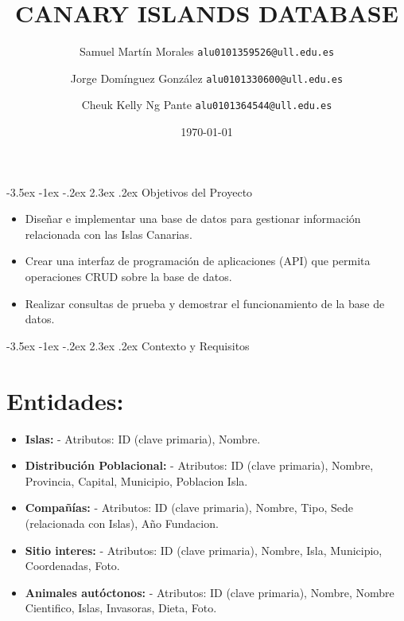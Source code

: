 \documentclass[11pt]{report}
\makeatletter
\renewcommand\chapter{\@startsection{chapter}{0}{\z@}%
    {-3.5ex \@plus -1ex \@minus -.2ex}%
    {2.3ex \@plus.2ex}%
    {\normalfont\Large\bfseries}}
\makeatother
\begin{document}
\title{CANARY ISLANDS DATABASE}
\author{Samuel Martín Morales  \texttt{alu0101359526@ull.edu.es} \and Jorge Domínguez González  \texttt{alu0101330600@ull.edu.es} \and Cheuk Kelly Ng Pante \texttt{alu0101364544@ull.edu.es} }
\date{\today}

\maketitle

\chapter{Objetivos del Proyecto}
\begin{itemize}
    \item Diseñar e implementar una base de datos para gestionar información relacionada con las Islas Canarias.
    \item Crear una interfaz de programación de aplicaciones (API) que permita operaciones CRUD sobre la base de datos.
    \item Realizar consultas de prueba y demostrar el funcionamiento de la base de datos.
\end{itemize}

\chapter{Contexto y Requisitos}
\section{Entidades:}

\begin{itemize}
    \item \textbf{Islas:}
    \subitem - Atributos: ID (clave primaria), Nombre.
    
    \item \textbf{Distribución Poblacional:}
    \subitem - Atributos: ID (clave primaria), Nombre, Provincia, Capital, Municipio, Poblacion Isla.
    
    \item \textbf{Compañías:}
    \subitem - Atributos: ID (clave primaria), Nombre, Tipo, Sede (relacionada con Islas), Año Fundacion.
    
    \item \textbf{Sitio interes:}
    \subitem - Atributos: ID (clave primaria), Nombre, Isla, Municipio, Coordenadas, Foto.
    
    \item \textbf{Animales autóctonos:}
    \subitem - Atributos: ID (clave primaria), Nombre, Nombre Cientifico, Islas, Invasoras, Dieta, Foto.
    
\end{itemize}
\end{document}
